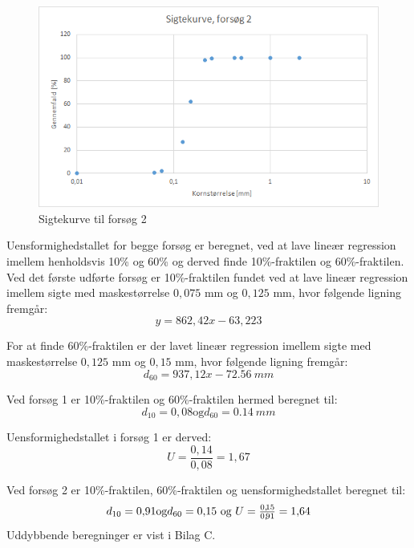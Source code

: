 \begin{figure}[htbp]
		\centering
		\includegraphics[width=1.0\textwidth]{billeder/sigtekurve2.png}
		\caption{Sigtekurve til forsøg 2}
		\label{fig:sigtekurve2}
\end{figure}

Uensformighedstallet for begge forsøg er beregnet, ved at lave lineær regression imellem henholdsvis 10\% og 60\% og derved finde 10\%-fraktilen og 60\%-fraktilen.
\newline
\newline
Ved det første udførte forsøg er 10\%-fraktilen fundet ved at lave lineær regression imellem sigte med maskestørrelse $0,\!075$ mm og $0,\!125$ mm, hvor følgende ligning fremgår: 
\begin{equation}
	y = 862,\!42x - 63,\!223
\end{equation}

For at finde 60\%-fraktilen er der lavet lineær regression imellem sigte med maskestørrelse $0,\!125$ mm og $0,\!15$ mm, hvor følgende ligning fremgår:
\begin{equation}
	d_{60}=937,\!12x - \SI{72,56}{mm}
\end{equation}

Ved forsøg 1 er 10\%-fraktilen og 60\%-fraktilen hermed beregnet til: 
\begin{equation}
	d_{10} = 0,\!08 \text{og} d_{60} = \SI{0,14}{mm}
\end{equation} 

Uensformighedstallet i forsøg 1 er derved:
\begin{equation}
	U = \frac{0,\!14}{0,\!08} = 1,\!67
\end{equation}

Ved forsøg 2 er 10\%-fraktilen, 60\%-fraktilen og uensformighedstallet beregnet til:
\begin{equation}
	d_{10} = 0,\!91 \text{og} d_{60} = 0,\!15$ \text{og} $U = \frac{0,\!15}{0,\!91} = 1,\!64
\end{equation} 
Uddybbende beregninger er vist i Bilag C.

